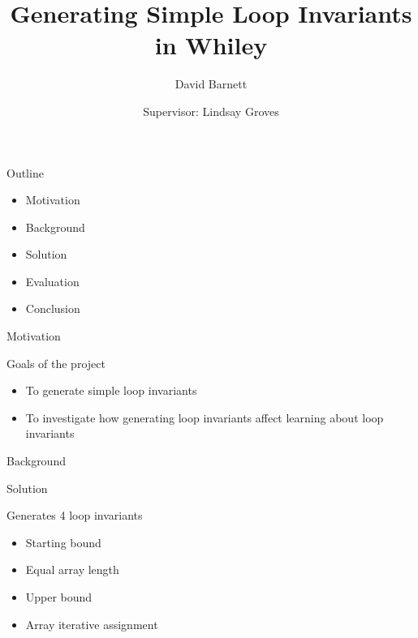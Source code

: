 

\title{Generating Simple Loop Invariants in Whiley}
\author{David Barnett}
\date{Supervisor: Lindsay Groves}


\frame{\titlepage}



\begin{frame}{Outline}

\begin{itemize}
\item Motivation
\item Background
\item Solution
\item Evaluation
\item Conclusion
\end{itemize}

\end{frame}



\begin{frame}{Motivation}

Goals of the project
\begin{itemize}
\item{To generate simple loop invariants}
\item{To investigate how generating loop invariants affect learning about loop
        invariants}
\end{itemize}

\end{frame}



\begin{frame}{Background}

\end{frame}



\begin{frame}{Solution}

Generates 4 loop invariants

\begin{itemize}
\item Starting bound
\item Equal array length
\item Upper bound
\item Array iterative assignment
\end{itemize}

\end{frame}



